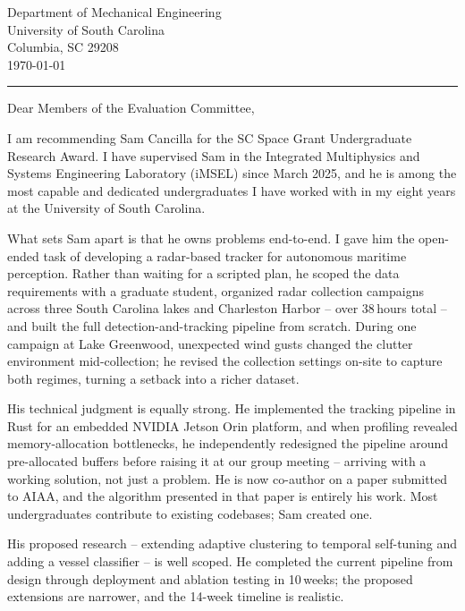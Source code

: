 \documentclass[12pt]{article}
\begin{document}
\noindent
Department of Mechanical Engineering\\
University of South Carolina\\
Columbia, SC 29208\\
\today
\vspace{0.5em}
\noindent

{\color{garnet}\rule{\textwidth}{0.5pt}}

\vspace{0.3em}

\noindent
Dear Members of the Evaluation Committee,

I am recommending Sam Cancilla for the SC Space Grant Undergraduate Research Award. I have supervised Sam in the Integrated Multiphysics and Systems Engineering Laboratory (iMSEL) since March 2025, and he is among the most capable and dedicated undergraduates I have worked with in my eight years at the University of South Carolina.

What sets Sam apart is that he owns problems end-to-end. I gave him the open-ended task of developing a radar-based tracker for autonomous maritime perception. Rather than waiting for a scripted plan, he scoped the data requirements with a graduate student, organized radar collection campaigns across three South Carolina lakes and Charleston Harbor -- over 38\,hours total -- and built the full detection-and-tracking pipeline from scratch. During one campaign at Lake Greenwood, unexpected wind gusts changed the clutter environment mid-collection; he revised the collection settings on-site to capture both regimes, turning a setback into a richer dataset.

His technical judgment is equally strong. He implemented the tracking pipeline in Rust for an embedded NVIDIA Jetson Orin platform, and when profiling revealed memory-allocation bottlenecks, he independently redesigned the pipeline around pre-allocated buffers before raising it at our group meeting -- arriving with a working solution, not just a problem. He is now co-author on a paper submitted to AIAA, and the algorithm presented in that paper is entirely his work. Most undergraduates contribute to existing codebases; Sam created one.

His proposed research -- extending adaptive clustering to temporal self-tuning and adding a vessel classifier -- is well scoped. He completed the current pipeline from design through deployment and ablation testing in 10\,weeks; the proposed extensions are narrower, and the 14-week timeline is realistic.
\end{document}
